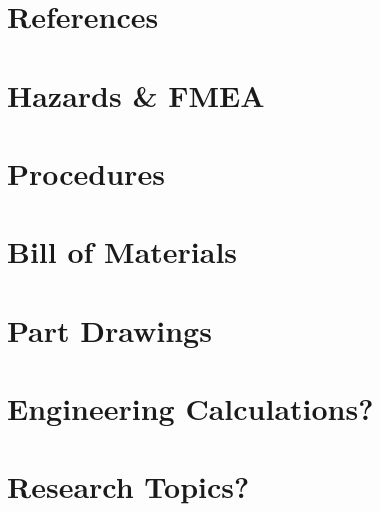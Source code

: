 \documentclass{report}
\begin{document}
    \chapter{References}

    \begin{appendices}
        \makeatletter
        \makeatother

        \chapter{Hazards \& FMEA}
        \chapter{Procedures}
        \chapter{Bill of Materials}
        \chapter{Part Drawings}
        \chapter{Engineering Calculations?}
        \chapter{Research Topics?}
    \end{appendices}
\end{document}
